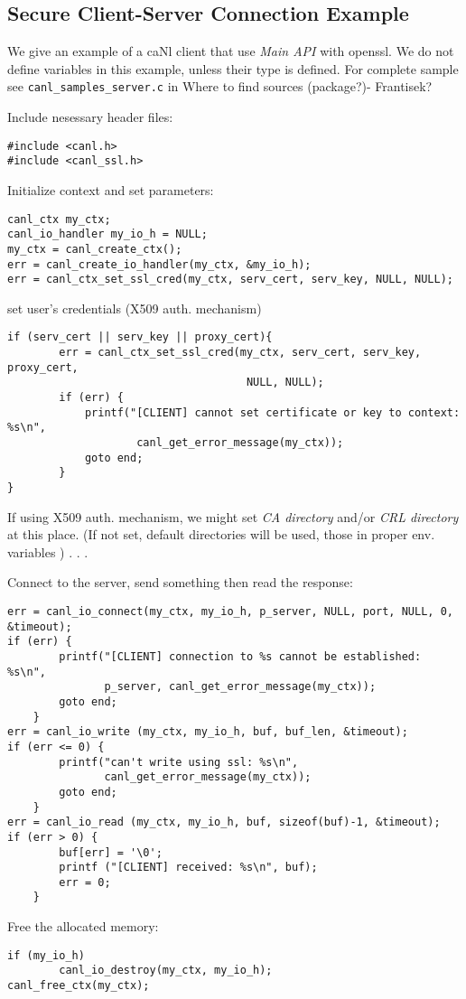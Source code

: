 \subsection{Secure Client-Server Connection Example}
We give an example of a caNl client that use \textit{Main API} 
with openssl. We do not define variables in this example, unless
their type is \CANL defined. For complete sample see 
{\tt canl\_samples\_server.c} in 
\TODO Where to find sources (package?)- Frantisek?

Include nesessary header files:
\begin{lstlisting}
#include <canl.h>
#include <canl_ssl.h>
\end{lstlisting}

Initialize context and set parameters:
\begin{lstlisting}
canl_ctx my_ctx;
canl_io_handler my_io_h = NULL;
my_ctx = canl_create_ctx();
err = canl_create_io_handler(my_ctx, &my_io_h);
err = canl_ctx_set_ssl_cred(my_ctx, serv_cert, serv_key, NULL, NULL);
\end{lstlisting}

set user's credentials (X509 auth. mechanism)
\begin{lstlisting}
if (serv_cert || serv_key || proxy_cert){
        err = canl_ctx_set_ssl_cred(my_ctx, serv_cert, serv_key, proxy_cert,
                                     NULL, NULL);
        if (err) {
            printf("[CLIENT] cannot set certificate or key to context: %s\n",
                    canl_get_error_message(my_ctx));
            goto end;
        }
}
\end{lstlisting}

If using X509 auth. mechanism, we might set \textit{CA directory} and/or
 \textit{CRL directory} at this place. (If not set, default directories
will be used, \ie those in proper env. variables )
.
.
.

Connect to the server, send something then read the response:

\begin{lstlisting}
err = canl_io_connect(my_ctx, my_io_h, p_server, NULL, port, NULL, 0, &timeout);
if (err) {
        printf("[CLIENT] connection to %s cannot be established: %s\n",
               p_server, canl_get_error_message(my_ctx));
        goto end;
    }
err = canl_io_write (my_ctx, my_io_h, buf, buf_len, &timeout);
if (err <= 0) {
        printf("can't write using ssl: %s\n",
               canl_get_error_message(my_ctx));
        goto end;
    }
err = canl_io_read (my_ctx, my_io_h, buf, sizeof(buf)-1, &timeout);
if (err > 0) {
        buf[err] = '\0';
        printf ("[CLIENT] received: %s\n", buf);
        err = 0;
    }
\end{lstlisting}

Free the allocated memory:

\begin{lstlisting}
if (my_io_h)
        canl_io_destroy(my_ctx, my_io_h);
canl_free_ctx(my_ctx);
\end{lstlisting}

